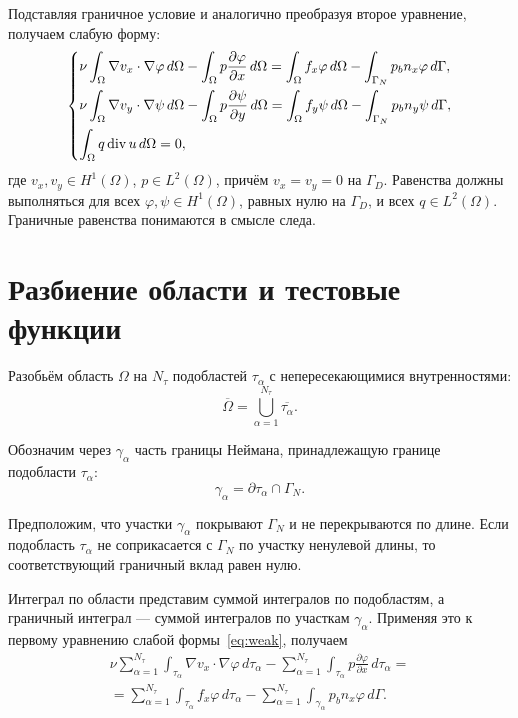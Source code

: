 \documentclass[a4paper,14pt]{extarticle}
\begin{document}
	Подставляя граничное условие и аналогично преобразуя второе
	уравнение, получаем слабую форму:
	\begin{equation}
		\begin{dcases}
			\nu\int_\Omega
			\nabla v_x\cdot\nabla\varphi \, d\Omega
			-
			\int_\Omega
			p\frac{\partial\varphi}{\partial x} \, d\Omega
			=
			\int_\Omega f_x\varphi \, d\Omega
			-
			\int_{\Gamma_N}
			p_b n_x\varphi \, d\Gamma,
			\\
			\nu\int_\Omega
			\nabla v_y\cdot\nabla\psi \, d\Omega
			-
			\int_\Omega
			p\frac{\partial\psi}{\partial y} \, d\Omega
			=
			\int_\Omega f_y\psi \, d\Omega
			-
			\int_{\Gamma_N}
			p_b n_y\psi \, d\Gamma,
			\\
			\int_\Omega q\operatorname{div}u \, d\Omega = 0,
		\end{dcases}
		\label{eq:weak}
	\end{equation}
	где $v_x,v_y\in H^1(\Omega)$, $p\in L^2(\Omega)$,
	причём $v_x=v_y=0$ на $\Gamma_D$. Равенства должны
	выполняться для всех $\varphi,\psi\in H^1(\Omega)$,
	равных нулю на $\Gamma_D$, и всех $q\in L^2(\Omega)$.
	Граничные равенства понимаются в смысле следа.

\section{Разбиение области и тестовые функции}

Разобьём область $\Omega$ на $N_\tau$ подобластей
$\tau_\alpha$ с непересекающимися внутренностями:
\begin{equation}
	\overline{\Omega}
	=
	\bigcup_{\alpha=1}^{N_\tau}
	\overline{\tau_\alpha}.
\end{equation}

Обозначим через $\gamma_\alpha$ часть границы Неймана,
принадлежащую границе подобласти $\tau_\alpha$:
\begin{equation}
	\gamma_\alpha
	=
	\partial\tau_\alpha \cap \Gamma_N.
\end{equation}

Предположим, что участки $\gamma_\alpha$ покрывают $\Gamma_N$
и не перекрываются по длине. Если подобласть $\tau_\alpha$
не соприкасается с $\Gamma_N$ по участку ненулевой длины,
то соответствующий граничный вклад равен нулю.

Интеграл по области представим суммой интегралов по подобластям,
а граничный интеграл --- суммой интегралов по участкам
$\gamma_\alpha$. Применяя это к первому уравнению слабой
формы~\eqref{eq:weak}, получаем
\begin{equation}
	\begin{gathered}
		\nu\sum_{\alpha=1}^{N_\tau}\int_{\tau_\alpha}
		\nabla v_x\cdot\nabla\varphi\,d\tau_\alpha
		-
		\sum_{\alpha=1}^{N_\tau}\int_{\tau_\alpha}
		p\frac{\partial\varphi}{\partial x}\,d\tau_\alpha
		=\\
		=
		\sum_{\alpha=1}^{N_\tau}\int_{\tau_\alpha}
		f_x\varphi\,d\tau_\alpha
		-
		\sum_{\alpha=1}^{N_\tau}\int_{\gamma_\alpha}
		p_b n_x\varphi\,d\Gamma.
	\end{gathered}
	\label{eq:parts_first}
\end{equation}
\end{document}
